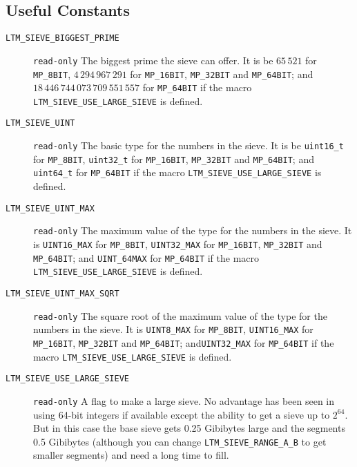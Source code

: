 \documentclass[synpaper]{book}
\begin{document}
\subsection{Useful Constants}
\begin{description}
\item[\texttt{LTM\_SIEVE\_BIGGEST\_PRIME}] \texttt{read-only} The biggest prime the sieve can offer. It is be $65\,521$ for \texttt{MP\_8BIT},
 $4\,294\,967\,291$ for \texttt{MP\_16BIT}, \texttt{MP\_32BIT} and \texttt{MP\_64BIT}; and
 $18\,446\,744\,073\,709\,551\,557$ for \texttt{MP\_64BIT} if the macro\\
 \texttt{LTM\_SIEVE\_USE\_LARGE\_SIEVE} is defined.

\item[\texttt{LTM\_SIEVE\_UINT}] \texttt{read-only}  The basic type for the numbers in the sieve. It is be \texttt{uint16\_t} for \texttt{MP\_8BIT}, \texttt{uint32\_t} for \texttt{MP\_16BIT}, \texttt{MP\_32BIT} and \texttt{MP\_64BIT}; and \texttt{uint64\_t} for \texttt{MP\_64BIT} if the macro \texttt{LTM\_SIEVE\_USE\_LARGE\_SIEVE} is defined.

\item[\texttt{LTM\_SIEVE\_UINT\_MAX}] \texttt{read-only} The maximum value of the type for the numbers in the sieve. It is \texttt{UINT16\_MAX} for \texttt{MP\_8BIT}, \texttt{UINT32\_MAX} for \texttt{MP\_16BIT}, \texttt{MP\_32BIT} and \texttt{MP\_64BIT}; and \texttt{UINT\_64MAX} for \texttt{MP\_64BIT} if the macro\\
\texttt{LTM\_SIEVE\_USE\_LARGE\_SIEVE} is defined.

\item[\texttt{LTM\_SIEVE\_UINT\_MAX\_SQRT}] \texttt{read-only} The square root of the maximum value of the type for the numbers in the sieve. It is \texttt{UINT8\_MAX} for \texttt{MP\_8BIT}, \texttt{UINT16\_MAX} for \texttt{MP\_16BIT}, \texttt{MP\_32BIT} and \texttt{MP\_64BIT}; and\texttt{UINT32\_MAX} for \texttt{MP\_64BIT} if the macro \texttt{LTM\_SIEVE\_USE\_LARGE\_SIEVE} is defined.

\item[\texttt{LTM\_SIEVE\_USE\_LARGE\_SIEVE}] \texttt{read-only} A flag to make a large sieve.  No advantage has been seen in using 64-bit integers if available except the ability to get a sieve up to $2^64$. But in this case the base sieve gets 0.25 Gibibytes large and the segments 0.5 Gibibytes (although you can change \texttt{LTM\_SIEVE\_RANGE\_A\_B} to get smaller segments) and need a long time to fill.


\end{description}
\end{document}
